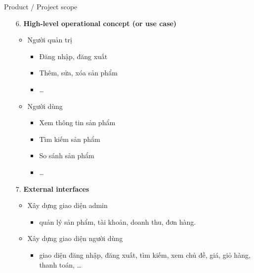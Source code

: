 \documentclass[compress]{beamer}
\begin{document}
\begin{frame}{Product / Project scope}
\begin{itemize}
\item[6. ] \textbf{High-level operational concept (or use case)}
\begin{itemize}
\item Người quản trị
\begin{itemize}
\item Đăng nhập, đăng xuất
\item Thêm, sửa, xóa sản phẩm
\item \ldots
\end{itemize}
\item Người dùng
\begin{itemize}
\item Xem thông tin sản phẩm
\item Tìm kiếm sản phẩm
\item So sánh sản phẩm
\item \ldots
\end{itemize}
\end{itemize}
\item[7. ] \textbf{External interfaces}
\begin{itemize}
\item Xây dựng giao diện admin
\begin{itemize}
\item quản lý sản phẩm, tài khoản, doanh thu, đơn hàng.
\end{itemize}
\item Xây dựng giao diện người dùng
\begin{itemize}
\item giao diện đăng nhập, đăng xuất, tìm kiếm, xem chủ đề, giá, giỏ hàng, thanh toán, \ldots
\end{itemize}
\end{itemize}
\end{itemize}
\end{frame}
\end{document}
